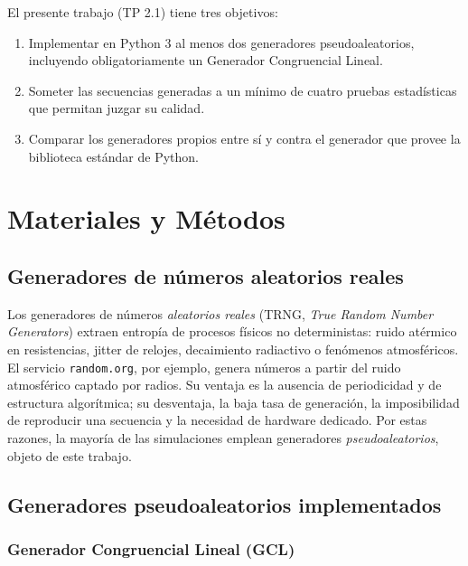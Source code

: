 \documentclass[11pt]{article}
\begin{document}
El presente trabajo (TP 2.1) tiene tres objetivos:

\begin{enumerate}
  \item Implementar en Python 3 al menos dos generadores
    pseudoaleatorios, incluyendo obligatoriamente un Generador
    Congruencial Lineal.
  \item Someter las secuencias generadas a un m\'inimo de cuatro pruebas
    estad\'isticas que permitan juzgar su calidad.
  \item Comparar los generadores propios entre s\'i y contra el generador
    que provee la biblioteca est\'andar de Python.
\end{enumerate}

\section{Materiales y M\'etodos}

\subsection{Generadores de n\'umeros aleatorios reales}

Los generadores de n\'umeros \emph{aleatorios reales} (TRNG, \emph{True
Random Number Generators}) extraen entrop\'ia de procesos f\'isicos no
deterministas: ruido at\'ermico en resistencias, jitter de relojes,
decaimiento radiactivo o fen\'omenos atmosf\'ericos. El servicio
\texttt{random.org}, por ejemplo, genera n\'umeros a partir del ruido
atmosf\'erico captado por radios. Su ventaja es la ausencia de
periodicidad y de estructura algor\'itmica; su desventaja, la baja tasa de
generaci\'on, la imposibilidad de reproducir una secuencia y la necesidad
de hardware dedicado. Por estas razones, la mayor\'ia de las simulaciones
emplean generadores \emph{pseudoaleatorios}, objeto de este trabajo.

\subsection{Generadores pseudoaleatorios implementados}

\subsubsection{Generador Congruencial Lineal (GCL)}
\end{document}
